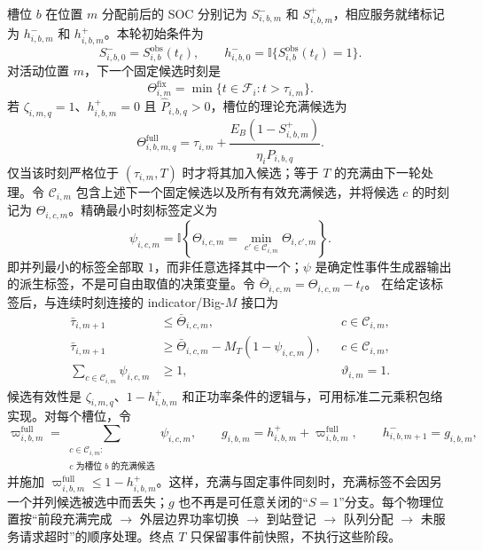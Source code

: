 \documentclass[12pt,a4paper,UTF8]{ctexart}
\begin{document}
槽位 $b$ 在位置 $m$ 分配前后的 SOC 分别记为
$S_{i,b,m}^{-}$ 和 $S_{i,b,m}^{+}$，相应服务就绪标记为
$h_{i,b,m}^{-}$ 和 $h_{i,b,m}^{+}$。本轮初始条件为
\begin{equation}
S_{i,b,0}^{-}=S_{i,b}^{\mathrm{obs}}(t_\ell),
\qquad
h_{i,b,0}^{-}=\mathbb I\{S_{i,b}^{\mathrm{obs}}(t_\ell)=1\}.
\label{eq:initial_battery_soc}
\end{equation}
对活动位置 $m$，下一个固定候选时刻是
\[
\Theta_{i,m}^{\mathrm{fix}}
=\min\{t\in\mathcal F_i:t>\tau_{i,m}\}.
\]
若 $\zeta_{i,m,q}=1$、$h_{i,b,m}^{+}=0$ 且
$\widehat P_{i,b,q}>0$，槽位的理论充满候选为
\begin{equation}
\Theta_{i,b,m,q}^{\mathrm{full}}
=\tau_{i,m}
+\frac{E_B(1-S_{i,b,m}^{+})}
{\eta_i\widehat P_{i,b,q}}.
\label{eq:full_time_candidate}
\end{equation}
仅当该时刻严格位于 $(\tau_{i,m},T)$ 时才将其加入候选；等于 $T$ 的充满由下一轮处理。令 $\mathcal C_{i,m}$ 包含上述下一个固定候选以及所有有效充满候选，并将候选 $c$ 的时刻记为 $\Theta_{i,c,m}$。精确最小时刻标签定义为
\[
\psi_{i,c,m}
=\mathbb I\!\left\{
\Theta_{i,c,m}=\min_{c'\in\mathcal C_{i,m}}
\Theta_{i,c',m}\right\}.
\]
即并列最小的标签全部取 $1$，而非任意选择其中一个；$\psi$ 是确定性事件生成器输出的派生标签，不是可自由取值的决策变量。令
$\bar\Theta_{i,c,m}=\Theta_{i,c,m}-t_\ell$。
在给定该标签后，与连续时刻连接的 indicator/Big-$M$ 接口为
\begin{subequations}
\label{eq:next_physical_event}
\begin{align}
\bar\tau_{i,m+1}&\le\bar\Theta_{i,c,m},
&&c\in\mathcal C_{i,m},\\
\bar\tau_{i,m+1}&\ge
\bar\Theta_{i,c,m}-M_T(1-\psi_{i,c,m}),
&&c\in\mathcal C_{i,m},\\
\sum_{c\in\mathcal C_{i,m}}\psi_{i,c,m}&\ge1,
&&\vartheta_{i,m}=1.
\end{align}
\end{subequations}
候选有效性是 $\zeta_{i,m,q}$、$1-h_{i,b,m}^{+}$ 和正功率条件的逻辑与，可用标准二元乘积包络实现。对每个槽位，令
\[
\varpi_{i,b,m}^{\mathrm{full}}
=\sum_{\substack{c\in\mathcal C_{i,m}:\\
c\text{ 为槽位 }b\text{ 的充满候选}}}
\psi_{i,c,m},
\qquad
g_{i,b,m}=h_{i,b,m}^{+}+\varpi_{i,b,m}^{\mathrm{full}},
\qquad
h_{i,b,m+1}^{-}=g_{i,b,m},
\]
并施加 $\varpi_{i,b,m}^{\mathrm{full}}\le1-h_{i,b,m}^{+}$。这样，充满与固定事件同刻时，充满标签不会因另一个并列候选被选中而丢失；$g$ 也不再是可任意关闭的“$S=1$”分支。每个物理位置按“前段充满完成 $\rightarrow$ 外层边界功率切换 $\rightarrow$ 到站登记 $\rightarrow$ 队列分配 $\rightarrow$ 未服务请求超时”的顺序处理。终点 $T$ 只保留事件前快照，不执行这些阶段。
\end{document}
